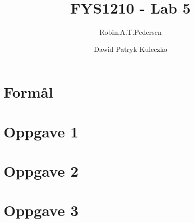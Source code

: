 \documentclass{article}
\begin{document}
\title{FYS1210 - Lab 5}
\author{Robin.A.T.Pedersen \and Dawid Patryk Kuleczko}
\maketitle

\section{Formål}


\section{Oppgave 1}


\section{Oppgave 2}


\section{Oppgave 3}

\end{document}
